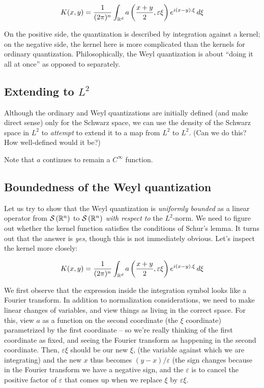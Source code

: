 \documentclass[a4paper]{amsart}
\newcommand{\schwarz}[1]{\mathcal{S}\left(#1\right)}
\begin{document}
$$K(x,y) = \frac{1}{(2\pi)^n}  \int_{\mathbb{R}^d} a \left(\frac{x+y}{2}, \varepsilon \xi \right) e^{i(x-y).\xi} \, d\xi$$

On the positive side, the quantization is described by integration
against a kernel; on the negative side, the kernel here is more
complicated than the kernels for ordinary
quantization. Philosophically, the Weyl quantization is about ``doing
it all at once'' as opposed to separately.

\subsection{Extending to $L^2$}

Although the ordinary and Weyl quantizations are initially defined
(and make direct sense) only for the Schwarz space, we can use the
density of the Schwarz space in $L^2$ to {\em attempt} to extend it to
a map from $L^2$ to $L^2$. (Can we do this? How well-defined would it
be?)

Note that $a$ continues to remain a $C^\infty$ function.

\subsection{Boundedness of the Weyl quantization}

Let us try to show that the Weyl quantization is {\em uniformly
  bounded} as a linear operator from $\schwarz{\R^n}$ to
$\schwarz{\R^n}$ {\em with respect to} the $L^2$-norm. We need to
figure out whether the kernel function satisfies the conditions of Schur's
lemma. It turns out that the answer is {\em yes}, though this is not
immediately obvious. Let's inspect the kernel more closely:

$$K(x,y) = \frac{1}{(2\pi)^n}  \int_{\mathbb{R}^d} a \left(\frac{x+y}{2}, \varepsilon \xi \right) e^{i(x-y).\xi} \, d\xi$$

We first observe that the expression inside the integration symbol
looks like a Fourier transform.  In addition to normalization
considerations, we need to make linear changes of variables, and view
things as living in the correct space. For this, view $a$ as a
function on the second coordinate (the $\xi$ coordinate) parametrized
by the first coordinate -- so we're really thinking of the first
coordinate as fixed, and seeing the Fourier transform as happening in
the second coordinate. Then, $\varepsilon \xi$ should be our new
$\xi$, (the variable against which we are integrating) and the new $x$
thus becomes $(y - x)/\varepsilon$ (the sign changes because in the
Fourier transform we have a negative sign, and the $\varepsilon$ is to
cancel the positive factor of $\varepsilon$ that comes up when we
replace $\xi$ by $\varepsilon \xi$.
\end{document}

